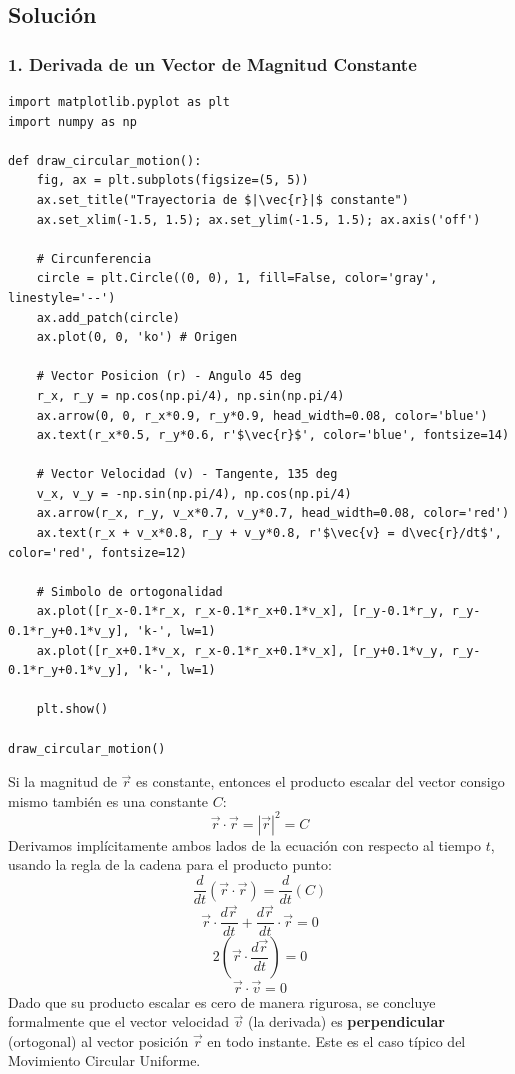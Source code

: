\documentclass[12pt, a4paper]{article}
\begin{document}
\subsection*{Solución}

\subsubsection*{1. Derivada de un Vector de Magnitud Constante}

\begin{lstlisting}
import matplotlib.pyplot as plt
import numpy as np

def draw_circular_motion():
    fig, ax = plt.subplots(figsize=(5, 5))
    ax.set_title("Trayectoria de $|\vec{r}|$ constante")
    ax.set_xlim(-1.5, 1.5); ax.set_ylim(-1.5, 1.5); ax.axis('off')
    
    # Circunferencia
    circle = plt.Circle((0, 0), 1, fill=False, color='gray', linestyle='--')
    ax.add_patch(circle)
    ax.plot(0, 0, 'ko') # Origen
    
    # Vector Posicion (r) - Angulo 45 deg
    r_x, r_y = np.cos(np.pi/4), np.sin(np.pi/4)
    ax.arrow(0, 0, r_x*0.9, r_y*0.9, head_width=0.08, color='blue')
    ax.text(r_x*0.5, r_y*0.6, r'$\vec{r}$', color='blue', fontsize=14)
    
    # Vector Velocidad (v) - Tangente, 135 deg
    v_x, v_y = -np.sin(np.pi/4), np.cos(np.pi/4)
    ax.arrow(r_x, r_y, v_x*0.7, v_y*0.7, head_width=0.08, color='red')
    ax.text(r_x + v_x*0.8, r_y + v_y*0.8, r'$\vec{v} = d\vec{r}/dt$', color='red', fontsize=12)
    
    # Simbolo de ortogonalidad
    ax.plot([r_x-0.1*r_x, r_x-0.1*r_x+0.1*v_x], [r_y-0.1*r_y, r_y-0.1*r_y+0.1*v_y], 'k-', lw=1)
    ax.plot([r_x+0.1*v_x, r_x-0.1*r_x+0.1*v_x], [r_y+0.1*v_y, r_y-0.1*r_y+0.1*v_y], 'k-', lw=1)

    plt.show()

draw_circular_motion()
\end{lstlisting}

Si la magnitud de $\vec{r}$ es constante, entonces el producto escalar del vector consigo mismo también es una constante $C$:
$$ \vec{r} \cdot \vec{r} = |\vec{r}|^2 = C $$
Derivamos implícitamente ambos lados de la ecuación con respecto al tiempo $t$, usando la regla de la cadena para el producto punto:
$$ \frac{d}{dt}(\vec{r} \cdot \vec{r}) = \frac{d}{dt}(C) $$
$$ \vec{r} \cdot \frac{d\vec{r}}{dt} + \frac{d\vec{r}}{dt} \cdot \vec{r} = 0 $$
$$ 2 \left( \vec{r} \cdot \frac{d\vec{r}}{dt} \right) = 0 $$
$$ \vec{r} \cdot \vec{v} = 0 $$
Dado que su producto escalar es cero de manera rigurosa, se concluye formalmente que el vector velocidad $\vec{v}$ (la derivada) es \textbf{perpendicular} (ortogonal) al vector posición $\vec{r}$ en todo instante. Este es el caso típico del Movimiento Circular Uniforme.
\end{document}
